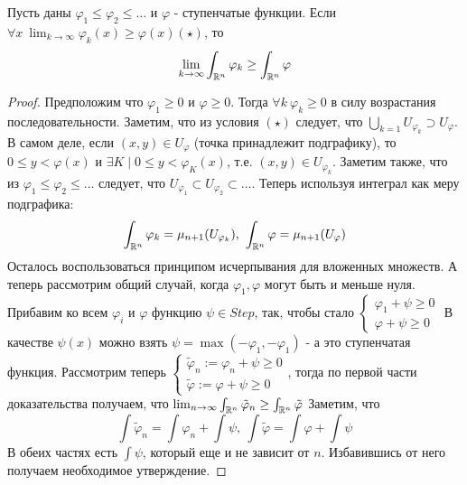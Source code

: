 \begin{statement*}
    Пусть даны $\varphi_1 \le \varphi_2 \le \hdots$ и $\varphi$ - ступенчатые функции. Если $\forall x \ \lim_{k \to \infty} \varphi_k (x) \ge \varphi(x) (\star)$, то \[\lim_{k \to \infty} \int_{\mathbb{R}^n} \varphi_k \ge \int_{\mathbb{R}^n} \varphi\]

    \begin{proof}
        Предположим что $\varphi_1 \ge 0$ и $\varphi \ge 0$. Тогда $\forall k \ \varphi_k \ge 0$ в силу возрастания последовательности. Заметим, что из условия $(\star)$ следует, что $\bigcup_{k=1}U_{\varphi_k} \supset U_{\varphi}$. 
        В самом деле, если $(x, y) \in U_\varphi$ (точка принадлежит подграфику), то $0 \le y < \varphi(x)$ и $\exists K \mid 0 \le y < \varphi_K(x)$, т.е. $(x, y) \in U_{\varphi_k}$.
        Заметим также, что из $\varphi_1 \le \varphi_2 \le \hdots$ следует, что $U_{\varphi_1} \subset U_{\varphi_2} \subset \hdots$. Теперь используя интеграл как меру подграфика:
        \[\int_{\mathbb{R}^n}\varphi_k = \mu_{n+1}(U_{\varphi_k}), \ \int_{\mathbb{R}^n}\varphi = \mu_{n+1}(U_{\varphi})\]
        Осталось воспользоваться принципом исчерпывания для вложенных множеств. 
\newline
        А теперь рассмотрим общий случай, когда $\varphi_1, \varphi$ могут быть и меньше нуля. Прибавим ко всем $\varphi_i$ и $\varphi$ функцию $\psi \in Step$, так, чтобы стало $\begin{cases*}
            \varphi_1 + \psi \ge 0 \\ \varphi + \psi \ge 0
        \end{cases*}$ В качестве $\psi(x)$ можно взять $\psi = \max(-\varphi_1, -\varphi_1)$ - а это ступенчатая функция.
        Рассмотрим теперь $\begin{cases*}
            \tilde{\varphi}_n := \varphi_n + \psi \ge 0 \\ 
            \tilde{\varphi} := \varphi + \psi \ge 0
        \end{cases*}$, тогда по первой части доказательства получаем, что 
        $\lim_{n \to \infty} \int_{\mathbb{R}^n} \tilde{\varphi}_n \ge \int_{\mathbb{R}^n} \tilde{\varphi}$
        Заметим, что 
        \[\int \tilde{\varphi}_n = \int \varphi_n + \int \psi, \ \int \tilde{\varphi} = \int \varphi + \int \psi\]
        В обеих частях есть $\int \psi$, который еще и не зависит от $n$. Избавившись от него получаем необходимое утверждение.
    \end{proof}
\end{statement*}

